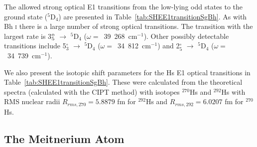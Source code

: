 \documentclass[10pt,a4paper, twoside]{report}
\begin{document}
The allowed strong optical E1 transitions from the low-lying odd states to the ground state ($^5$D$_{4}$) are presented in Table~\ref{tab:SHEE1transitionSgBh}. As with Bh \textsc{i} there is a large number of strong optical transitions. The transition with the largest rate is 3$_5^{\rm o}$ $\rightarrow$ $^5$D$_{4}$ ($\omega =$~39~268~cm$^{-1}$). Other possibly detectable transitions include 5$_3^{\circ}$ $\rightarrow$ $^5$D$_{4}$ ($\omega =$~34~812~cm$^{-1}$) and 2$_5^{\circ}$ $\rightarrow$ $^5$D$_{4}$ ($\omega= $~34~739~cm$^{-1}$).

We also present the isotopic shift parameters for the Hs E1 optical transitions in Table~\ref{tab:SHEE1transitionSgBh}. These were calculated from the theoretical spectra (calculated with the CIPT method) with isotopes $^{270}$Hs and $^{292}$Hs with RMS nuclear radii $R_{rms,\text{270}} = 5.8879$ fm for $^{292}$Hs and $R_{rms,\text{292}} = 6.0207$ fm for $^{270}$Hs.

\subsection{The Meitnerium Atom} \label{sec:Mt}
\end{document}
